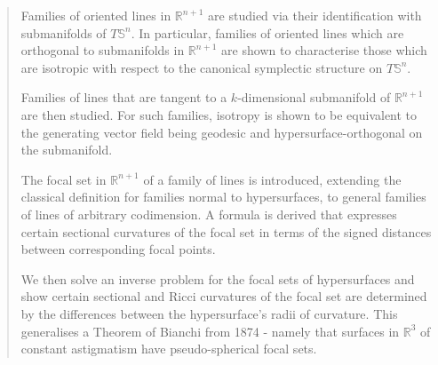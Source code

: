 \documentclass[12pt]{amsart}
\theoremstyle{plain}
\theoremstyle{definition}
\def\R{\mathbb{R}}
\def\S{\mathbb{S}}
\numberwithin{equation}{section}
\begin{document}
\begin{abstract}
Families of oriented lines in $\mathbb{R}^{n+1}$ are studied via their identification with submanifolds of $T\S^n$. In particular, families of oriented lines which are orthogonal to submanifolds in $\mathbb{R}^{n+1}$ are shown to characterise those which are isotropic with respect to the canonical symplectic structure on $T\S^n$.
   
Families of lines that are tangent to a $k$-dimensional submanifold of $\R^{n+1}$ are then studied. For such families, isotropy is shown to be equivalent to the generating vector field being geodesic and hypersurface-orthogonal on the submanifold.
   
The focal set in $\R^{n+1}$ of a family of lines is introduced, extending the classical definition for families normal to hypersurfaces, to general families of lines of arbitrary codimension. A formula is derived that expresses certain sectional curvatures of the focal set in terms of the signed distances between corresponding focal points. 

We then solve an inverse problem for the focal sets of hypersurfaces and show certain sectional and Ricci curvatures of the focal set are determined by the differences between the hypersurface's radii of curvature. This generalises a Theorem of Bianchi from 1874 - namely that surfaces in $\R^3$ of constant astigmatism have pseudo-spherical focal sets.
   
\end{abstract}
\maketitle
\end{document}
